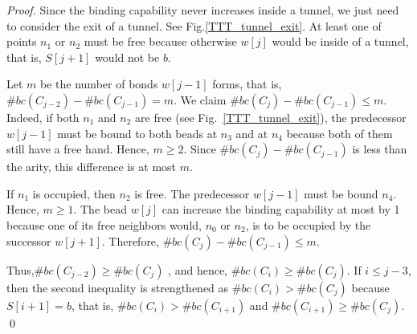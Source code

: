 \begin{proof}%
Since the binding capability never increases inside a tunnel, we just need to consider the exit of a tunnel.
See Fig.\ref{TTT_tunnel_exit}. 
At least one of points $n_1$ or $n_2$ must be free because otherwise $w[j]$ would be inside of a tunnel, that is, $S[j+1]$ would not be $b$.



Let $m$ be the number of bonds $w[j-1]$ forms, that is, $\#bc(C_{j-2}) - \#bc(C_{j-1}) = m$.
We claim $\#bc(C_{j}) - \#bc(C_{j-1}) \leq m$.
Indeed, if both $n_1$ and $n_2$ are free (see Fig.~\ref{TTT_tunnel_exit}), the predecessor $w[j-1]$ must be bound to both beads at $n_3$ and at $n_4$ because both of them still have a free hand.
Hence, $m \geq 2$.
Since $\#bc(C_{j}) - \#bc(C_{j-1})$ is less than the arity, this difference is at most $m$.

If $n_1$ is occupied, then $n_2$ is free.
The predecessor $w[j-1]$ must be bound $n_4$.
Hence,  $m \geq 1$.
The bead $w[j]$ can increase the binding capability at most by 1 because one of its free neighbors would, $n_0$ or $n_2$, is to be occupied by the successor $w[j+1]$.
Therefore, $\#bc(C_{j}) - \#bc(C_{j-1}) \leq m$.
  


Thus,$\#bc(C_{j-2}) \geq \#bc(C_j)$ , and hence, $\#bc(C_{i}) \geq \#bc(C_j)$.
If $i \leq j-3$, then the second inequality is strengthened as $\#bc(C_{i}) > \#bc(C_{j})$ because $S[i+1] = b$, that is, $\#bc(C_{i}) > \#bc(C_{i+1})$ and $\#bc(C_{i+1}) \geq \#bc(C_j)$. \qed


\end{proof}


